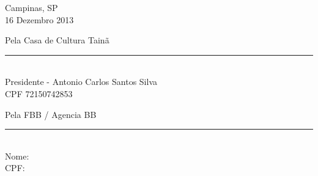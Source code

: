 \documentclass[a4paper, 11pt, oneside]{Relatorio_sem}  %
\begin{document}
\vfill



\vfill

Campinas, SP \\
16 Dezembro 2013

Pela Casa de Cultura Tainã

\begin{center}
\rule{15em}{0.5pt}\\
Presidente - Antonio Carlos Santos Silva\\
CPF 72150742853 
\end{center}

Pela FBB / Agencia BB

\begin{center}
\rule{15em}{0.5pt}\\
Nome: \ \ \ \ \ \ \ \ \ \ \ \ \ \ \ \ \ \ \ \ \ \ \ \ \ \ \ \ \ \ \ \ \ \\
CPF: \ \ \ \ \ \ \ \ \ \ \ \ \ \ \ \ \ \ \ \ \ \ \ \ \ \ \ \ \ \ \ \ \ \ 
\end{center}

\clearpage  %



\fancyhead{}  %
\rhead{\thepage}  %
\lhead{}  %

\pagestyle{fancy}  %




 
\end{document}
